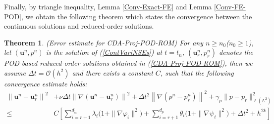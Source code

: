 \documentclass[10pt,twoside,openany,UTF8,CJK]{article}
\newtheorem{Theorem}{Theorem}[section]
\begin{document}
	\indent Finally, by triangle inequality, Lemma \ref{Conv-Exact-FE} and Lemma \ref{Conv-FE-POD}, we obtain the following theorem which states the convergence between the continuous solutions and reduced-order solutions.  		
	\begin{Theorem}\label{Conv-Exact-POD}
		(Error estimate for CDA-Proj-POD-ROM) For any $n \geq n_0$($n_0 \geq 1$), let $\left(\boldsymbol{u}^n, p^n\right)$ is the solution of (\ref{ContVariNSEs}) at $t=t_n$,  $\left(\boldsymbol{u}_r^n, p_r^n\right)$ denotes the POD-based reduced-order solutions obtained in (\ref{CDA-Proj-POD-ROM}), then we assume $\Delta t = \mathcal{O}(h^2)$ and there exists a constant $C$, such that the following convergence estimate holds:
	\begin{equation}
	\begin{aligned}
		\left\|\boldsymbol{u}^n-\boldsymbol{u}_r^n\right\|^2 & + \nu \Delta t \left\|\nabla\left(\boldsymbol{u}^n-\boldsymbol{u}_r^n\right)\right\|^2 + \Delta t^2 \left\|\nabla\left(p^n-p_r^n\right)\right\|^2 + \gamma_p\|p-p_r\|^2_{\ell(L^2)} \\
		\leq&  C\left[\sum_{i=r+1}^{d_{\tilde{\boldsymbol{u}}}} \lambda_i\bigg(1 + \|\nabla\varphi_i\|^2\bigg) + \sum_{i=r+1}^{d_p} \theta_i\bigg(1 + \|\nabla\psi_i\|^2\bigg) + \Delta t^2 + h^{2k}\right]
	\end{aligned}
    \end{equation}		
    \end{Theorem}			
    \newpage
\end{document}
